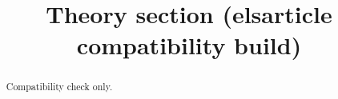 \documentclass[preprint,12pt]{elsarticle}
\begin{document}
\begin{frontmatter}
\title{Theory section (elsarticle compatibility build)}
\begin{abstract}Compatibility check only.\end{abstract}
\end{frontmatter}



\end{document}

